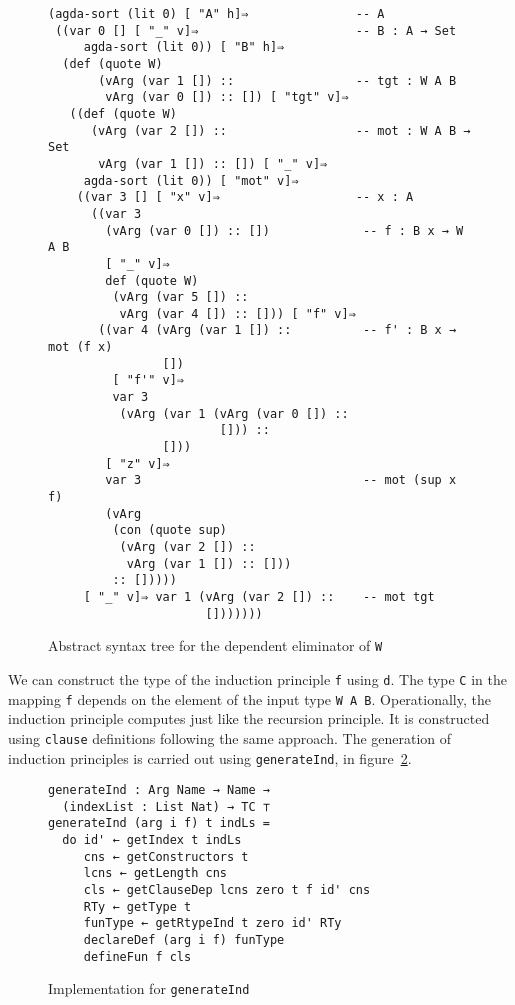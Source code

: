 \documentclass[sigplan,10pt]{acmart}
\begin{document}
\begin{figure}
\begin{center}
\begingroup
\fontsize{7pt}{9pt}\selectfont
\begin{Verbatim}
(agda-sort (lit 0) [ "A" h]⇒               -- A
 ((var 0 [] [ "_" v]⇒                      -- B : A → Set
     agda-sort (lit 0)) [ "B" h]⇒
  (def (quote W)
       (vArg (var 1 []) ::                 -- tgt : W A B
        vArg (var 0 []) :: []) [ "tgt" v]⇒
   ((def (quote W)
      (vArg (var 2 []) ::                  -- mot : W A B → Set
       vArg (var 1 []) :: []) [ "_" v]⇒
     agda-sort (lit 0)) [ "mot" v]⇒
    ((var 3 [] [ "x" v]⇒                   -- x : A
      ((var 3
        (vArg (var 0 []) :: [])             -- f : B x → W A B
        [ "_" v]⇒
        def (quote W)
         (vArg (var 5 []) :: 
          vArg (var 4 []) :: [])) [ "f" v]⇒
       ((var 4 (vArg (var 1 []) ::          -- f' : B x → mot (f x)
                [])
         [ "f'" v]⇒
         var 3
          (vArg (var 1 (vArg (var 0 []) ::
                        [])) ::
                []))
        [ "z" v]⇒
        var 3                               -- mot (sup x f)
        (vArg
         (con (quote sup)
          (vArg (var 2 []) :: 
           vArg (var 1 []) :: []))
         :: []))))
     [ "_" v]⇒ var 1 (vArg (var 2 []) ::    -- mot tgt
                      []))))))
\end{Verbatim}
\endgroup
\end{center}
\caption{Abstract syntax tree for the dependent eliminator of {\tt W}}
\label{fig:ast-d'}
\end{figure}
\normalsize

We can construct the type of the induction principle {\tt f} using {\tt d}. The type {\tt C} in the mapping {\tt f} depends on the element of the input type {\tt W A B}.
Operationally, the induction principle computes just like the recursion principle.
It is constructed using {\tt clause} definitions following the same approach.
The generation of induction principles is carried out using {\tt generateInd}, in figure~\ref{fig:generateInd}.


\begin{figure}
\begin{center}
\begin{Verbatim}
generateInd : Arg Name → Name → 
  (indexList : List Nat) → TC ⊤
generateInd (arg i f) t indLs =
  do id' ← getIndex t indLs
     cns ← getConstructors t
     lcns ← getLength cns
     cls ← getClauseDep lcns zero t f id' cns
     RTy ← getType t
     funType ← getRtypeInd t zero id' RTy
     declareDef (arg i f) funType
     defineFun f cls
\end{Verbatim}

\end{center}
\caption{Implementation for {\tt generateInd}}
\label{fig:generateInd}
\end{figure}
\normalsize
\end{document}
